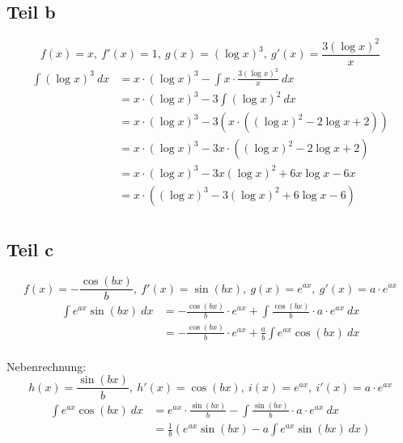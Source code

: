 \documentclass[a4paper,10pt]{article}
\begin{document}
\subsection*{Teil b}

\begin{equation}
 f(x) = x,\ f'(x) = 1,\ g(x) = (\log x)^3,\ g'(x) = \frac{3 (\log x)^2}{x}
\end{equation}
\begin{align*}
 \int (\log x)^3\ dx & = x \cdot (\log x)^3 - \int x \cdot \frac{3 (\log x)^2}{x}\ dx\\
 & = x \cdot (\log x)^3 - 3 \int (\log x)^2\ dx\\
 & = x \cdot (\log x)^3 - 3 \left( x \cdot ((\log x)^2 - 2 \log x + 2) \right)\\
 & = x \cdot (\log x)^3 - 3x \cdot ((\log x)^2 - 2 \log x + 2)\\
 & = x \cdot (\log x)^3 - 3x(\log x)^2 + 6x \log x - 6x\\
 & = x \cdot \left( (\log x)^3 - 3(\log x)^2 + 6 \log x - 6 \right)\\
\end{align*}

\subsection*{Teil c}

\begin{equation}
 f(x) = -\frac{\cos(bx)}{b},\ f'(x) = \sin(bx),\ g(x) = e^{ax},\ g'(x) = a \cdot e^{ax}
\end{equation}
\begin{align*}
 \int e^{ax} \sin(bx)\ dx & = -\frac{\cos(bx)}{b} \cdot e^{ax} + \int \frac{\cos(bx)}{b} \cdot a \cdot e^{ax}\ dx\\
 & = -\frac{\cos(bx)}{b} \cdot e^{ax} + \frac{a}{b} \int e^{ax}\cos(bx)\ dx\\
\end{align*}

Nebenrechnung:
\begin{equation}
 h(x) = \frac{\sin(bx)}{b},\ h'(x) = \cos(bx),\ i(x) = e^{ax},\ i'(x) = a \cdot e^{ax}
\end{equation}
\begin{align*}
 \int e^{ax}\cos(bx)\ dx & = e^{ax} \cdot \frac{\sin(bx)}{b} - \int \frac{\sin(bx)}{b} \cdot a \cdot e^{ax} \ dx\\
 & = \frac{1}{b} \left( e^{ax} \sin(bx) - a \int e^{ax} \sin(bx) \ dx \right)\\
\end{align*}
\end{document}
